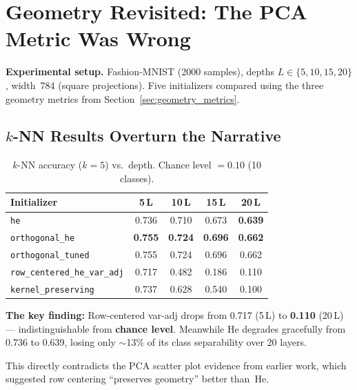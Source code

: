 \chapter{Geometry Revisited: The PCA Metric Was Wrong}
\label{ch:geometry}

\noindent
\textbf{Experimental setup.}
Fashion-MNIST (2000 samples), depths $L \in \{5, 10, 15, 20\}$,
width~784 (square projections).  Five initializers compared using the
three geometry metrics from Section~\ref{sec:geometry_metrics}.

\section{$k$-NN Results Overturn the Narrative}

\begin{table}[h]
\centering
\begin{tabular}{lcccc}
\toprule
Initializer & 5\,L & 10\,L & 15\,L & 20\,L \\
\midrule
\texttt{he}                          & 0.736 & 0.710 & 0.673 & \textbf{0.639} \\
\texttt{orthogonal\_he}              & \textbf{0.755} & \textbf{0.724} & \textbf{0.696} & \textbf{0.662} \\
\texttt{orthogonal\_tuned}           & 0.755 & 0.724 & 0.696 & 0.662 \\
\texttt{row\_centered\_he\_var\_adj} & 0.717 & 0.482 & 0.186 & 0.110 \\
\texttt{kernel\_preserving}          & 0.737 & 0.628 & 0.540 & 0.100 \\
\bottomrule
\end{tabular}
\caption{$k$-NN accuracy ($k=5$) vs.\ depth.
  Chance level $= 0.10$ (10 classes).}
\label{tab:knn}
\end{table}

\textbf{The key finding:}
Row-centered var-adj drops from 0.717 (5\,L) to \textbf{0.110} (20\,L)
--- indistinguishable from \textbf{chance level}.
Meanwhile He degrades gracefully from 0.736 to 0.639, losing only
$\sim$13\% of its class separability over 20 layers.

This directly contradicts the PCA scatter plot evidence from earlier
work, which suggested row centering ``preserves geometry'' better
than~He.

